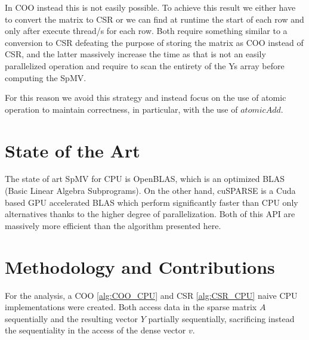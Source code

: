 \documentclass[conference]{IEEEtran}
\begin{document}
In COO instead this is not easily possible. To achieve this result we either have to convert the matrix to CSR  or we can find at runtime the start of each row and only after execute thread/s for each row. Both require something similar to a conversion to CSR defeating the purpose of storing the matrix as COO instead of CSR, and the latter massively increase the time as that is not an easily parallelized operation and require to scan the entirety of the Ys array before computing the SpMV.

For this reason we avoid this strategy and instead focus on the use of atomic operation to maintain correctness, in particular, with the use of $atomicAdd$.

\section{State of the Art}
The state of art SpMV for CPU is OpenBLAS, which is an optimized BLAS (Basic Linear Algebra Subprograms). On the other hand, cuSPARSE is a Cuda based GPU accelerated BLAS which perform significantly faster than CPU only alternatives thanks to the higher degree of parallelization. Both of this API are massively more efficient than the algorithm presented here.

\section{Methodology and Contributions}\label{sec:methodology}



For the analysis, a COO \ref{alg:COO_CPU} and CSR \ref{alg:CSR_CPU} naive CPU implementations were created. Both access data in the sparse matrix $A$ sequentially and the resulting vector $Y$ partially sequentially, sacrificing instead the sequentiality in the access of the dense vector $v$.
\end{document}
